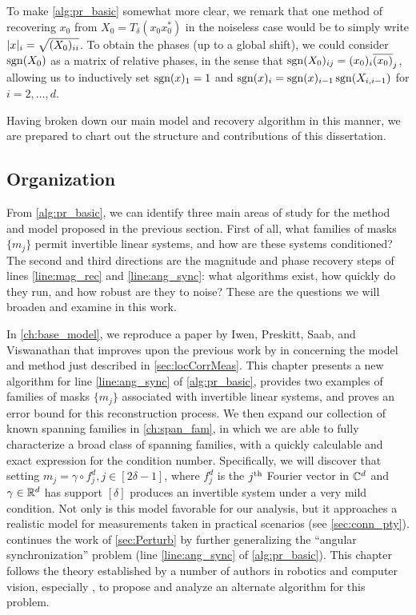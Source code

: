 To make \cref{alg:pr_basic} somewhat more clear, we remark that one method of recovering $x_0$ from $X_0 = T_\delta(x_0 x_0^*)$ in the noiseless case would be to simply write $\lvert x\rvert_i = \sqrt{(X_0)_{ii}}$.  To obtain the phases (up to a global shift), we could consider $\operatorname{sgn}(X_0)$ as a matrix of relative phases, in the sense that $\operatorname{sgn}(X_0)_{ij} = (x_0)_i \overline{(x_0)}_j$, allowing us to inductively set $\operatorname{sgn}(x)_1 = 1$ and $\operatorname{sgn}(x)_i = \operatorname{sgn}(x)_{i-1} \operatorname{sgn}(X_{i, i-1})$ for $i = 2,\ldots, d$.

Having broken down our main model and recovery algorithm in this manner, we are prepared to chart out the structure and contributions of this dissertation.

\subsection{Organization}
\label{sec:organization}

From \cref{alg:pr_basic}, we can identify three main areas of study for the method and model proposed in the previous section.  First of all, what families of masks $\{m_j\}$ permit invertible linear systems, and how are these systems conditioned?  The second and third directions are the magnitude and phase recovery steps of lines \ref{line:mag_rec} and \ref{line:ang_sync}: what algorithms exist, how quickly do they run, and how robust are they to noise?  These are the questions we will broaden and examine in this work.

In \cref{ch:base_model}, we reproduce a paper by Iwen, Preskitt, Saab, and Viswanathan that improves upon the previous work by \citeauthor*{IVW2015_FastPhase} in \cite{IVW2015_FastPhase} concerning the model and method just described in \cref{sec:locCorrMeas}.  This chapter presents a new algorithm for line \ref{line:ang_sync} of \cref{alg:pr_basic}, provides two examples of families of masks $\{m_j\}$ associated with invertible linear systems, and proves an error bound for this reconstruction process.  We then expand our collection of known spanning families in \cref{ch:span_fam}, in which we are able to fully characterize a broad class of spanning families, with a quickly calculable and exact expression for the condition number.  Specifically, we will discover that setting $m_j = \gamma \circ f_j^d, j \in [2 \delta - 1]$, where $f_j^d$ is the $j^{\text{th}}$ Fourier vector in $\mathbb{C}^d$ and $\gamma \in \mathbb{R}^d$ has support $[\delta]$ produces an invertible system under a very mild condition.  Not only is this model favorable for our analysis, but it approaches a realistic model for measurements taken in practical scenarios (see \cref{sec:conn_pty}).   continues the work of \cref{sec:Perturb} by further generalizing the ``angular synchronization'' problem (line \ref{line:ang_sync} of \cref{alg:pr_basic}).  This chapter follows the theory established by a number of authors in robotics and computer vision, especially \cite{bandeira2016se_sync,calafiore2016complex_pgo}, to propose and analyze an alternate algorithm for this problem.

